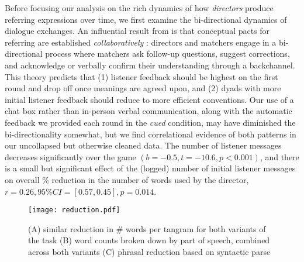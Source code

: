 Before focusing our analysis on the rich dynamics of how \emph{directors} produce referring expressions over time, we first examine the bi-directional dynamics of dialogue exchanges. 
An influential result from is that conceptual pacts for referring are established \emph{collaboratively} \cite[see also \cite{KraussWeinheimer66_Tangrams, GarrodFayLeeOberlanderMacLeod07_GraphicalSymbolSystems}]{ClarkWilkesGibbs86_ReferringCollaborative}: 
directors and matchers engage in a bi-directional process where matchers ask follow-up questions, suggest corrections, and acknowledge or verbally confirm their understanding through a backchannel. 
This theory predicts that (1) listener feedback should be highest on the first round and drop off once meanings are agreed upon, and (2) dyads with more initial listener feedback should reduce to more efficient conventions. 
Our use of a chat box rather than in-person verbal communication, along with the automatic feedback we provided each round in the \emph{cued} condition, may have diminished the bi-directionality somewhat, but we find correlational evidence of both patterns in our uncollapsed but otherwise cleaned data. 
The number of listener messages decreases significantly over the game $(b=-0.5, t = -10.6, p < 0.001)$, and there is a small but significant effect of the (logged) number of initial listener messages on overall \% reduction in the number of words used by the director, $r = 0.26, 95\% CI = [0.57, 0.45], p = 0.014$.

\begin{figure}[t]
\texttt{[image: reduction.pdf]}
\caption{(A) similar reduction in \# words per tangram for both variants of the task (B) word counts broken down by part of speech, combined across both variants (C) phrasal reduction based on syntactic parse }
\label{fig:reduction}
\end{figure}

